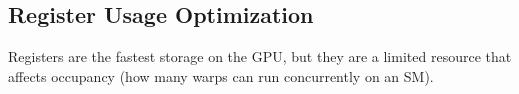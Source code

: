 \subsection{Register Usage Optimization}

Registers are the fastest storage on the GPU, but they are a limited resource that affects occupancy (how many warps can run concurrently on an SM).

